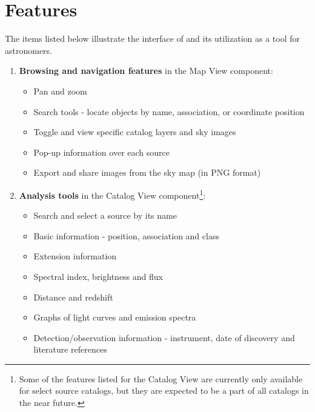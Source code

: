 \renewcommand{\thefootnote}{\fnsymbol{footnote}}

\section{Features}

The items listed below illustrate the interface of \gammasky and its utilization as a tool for astronomers.

\begin{enumerate}

\item \textbf{Browsing and navigation features} in the Map View component:

\begin{itemize}
\item Pan and zoom
\item Search tools - locate objects by name, association, or coordinate position
\item Toggle and view specific catalog layers and sky images
\item Pop-up information over each source
\item Export and share images from the sky map (in PNG format)
\end{itemize}

\item \textbf{Analysis tools} in the Catalog View component\footnote[1]{Some of the features listed for the Catalog View are currently only available for select source catalogs, but they are expected to be a part of all catalogs in the near future.}:

\begin{itemize}

\item Search and select a source by its name
\item Basic information - position, association and class
\item Extension information
\item Spectral index, brightness and flux
\item Distance and redshift
\item Graphs of light curves and emission spectra
\item Detection/observation information - instrument, date of discovery and literature references

\end{itemize}

\end{enumerate}
